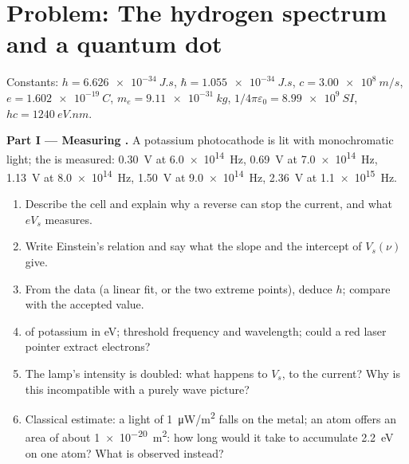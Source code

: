 \section{Problem: The hydrogen spectrum and a quantum dot}

\begin{problem}
\label{pb:b1:quantum-introduction:1}
Constants: $h = \qty{6.626e-34}{J.s}$, $\hbar = \qty{1.055e-34}{J.s}$, $c =
\qty{3.00e8}{m/s}$, $e = \qty{1.602e-19}{C}$, $m_e = \qty{9.11e-31}{kg}$,
$1/4\pi\varepsilon_0 = \qty{8.99e9}{SI}$, $hc = \qty{1240}{eV.nm}$.

\medskip
\noindent\textbf{Part I --- Measuring .}
A potassium photocathode is lit with monochromatic light; the  is measured: \qty{0.30}{V} at \qty{6.0e14}{Hz}, \qty{0.69}{V} at
\qty{7.0e14}{Hz}, \qty{1.13}{V} at \qty{8.0e14}{Hz}, \qty{1.50}{V} at
\qty{9.0e14}{Hz}, \qty{2.36}{V} at \qty{1.1e15}{Hz}.
\begin{enumerate}
  \item Describe the cell and explain why a reverse  can stop
        the current, and what $eV_s$ measures.
  \item Write Einstein's relation and say what the slope and the
        intercept of $V_s(\nu)$ give.
  \item From the data (a linear fit, or the two extreme points),
        deduce $h$; compare with the accepted value.
  \item {} of potassium in eV; threshold frequency and
        wavelength; could a red laser pointer extract electrons?
  \item The lamp's intensity is doubled: what happens to $V_s$, to the
        current? Why is this incompatible with a purely wave picture?
  \item Classical estimate: a light of \qty{1}{\micro W/m^2} falls on the
        metal; an atom offers an area of about \qty{1e-20}{m^2}: how long
        would it take to accumulate \qty{2.2}{eV} on one atom? What is
        observed instead?
\end{enumerate}


\end{problem}
